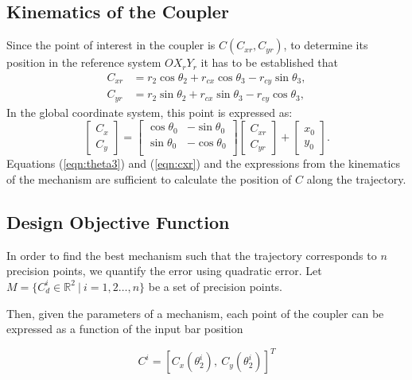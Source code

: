 \documentclass[12pt,letterpape]{article}
\begin{document}
\subsection{Kinematics of the Coupler} %
\label{sec:kinematics_of_the_coupler}
Since the point of interest in the coupler is $C(C_{xr}, C_{yr})$, to determine
its position in the reference system $OX_r Y_r$ it has to be established that
\begin{align}
	C_{xr} &= r_2 \cos\theta_2 + r_{cx}\cos\theta_3 - r_{cy}\sin\theta_3,\\
	C_{yr} &= r_2 \sin\theta_2 + r_{cx}\sin\theta_3 - r_{cy}\cos\theta_3,
\end{align}
In the global coordinate system, this point is expressed as:
\begin{equation}
	\begin{bmatrix}
		C_x \\ C_y
	\end{bmatrix}
	=
	\begin{bmatrix}
		\cos\theta_0 & -\sin\theta_0\\
		\sin\theta_0 & -\cos\theta_0\\
	\end{bmatrix}
	\begin{bmatrix}
		C_{xr} \\ C_{yr}
	\end{bmatrix}
	+\begin{bmatrix}
		x_0 \\ y_0
	\end{bmatrix}.
	\label{eqn:cxr}
\end{equation}
Equations (\ref{eqn:theta3}) and (\ref{eqn:cxr}) and the expressions from the
kinematics of the mechanism are sufficient to calculate the position of
$C$ along the trajectory.

\subsection{Design Objective Function} %

In order to find the best mechanism such that the trajectory corresponds to $n$
precision points, we quantify the error using quadratic error. Let 
$M = \{ C^i_d \in \mathbb{R}^2 \ | \ i =1,2\ldots,n \}$ be a set of precision points.

Then, given the parameters of a mechanism, each point of the coupler can be
expressed as a function of the input bar position

$$
 C^i = [ C_x(\theta_2^i),\ C_y(\theta_2^i)]^T
$$
\end{document}
